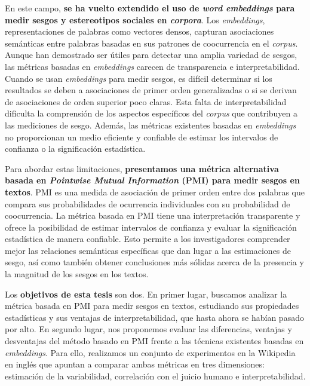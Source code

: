 En este campo, \textbf{se ha vuelto extendido el uso de \emph{word embeddings} para medir sesgos y estereotipos sociales en \emph{corpora}}. Los \emph{embeddings}, representaciones de palabras como vectores densos, capturan asociaciones semánticas entre palabras basadas en sus patrones de coocurrencia en el \emph{corpus}. Aunque han demostrado ser útiles para detectar una amplia variedad de sesgos, las métricas basadas en \emph{embeddings} carecen de transparencia e interpretabilidad. Cuando se usan \emph{embeddings} para medir sesgos, es difícil determinar si los resultados se deben a asociaciones de primer orden generalizadas o si se derivan de asociaciones de orden superior poco claras. Esta falta de interpretabilidad dificulta la comprensión de los aspectos específicos del \emph{corpus} que contribuyen a las mediciones de sesgo. Además, las métricas existentes basadas en \emph{embeddings} no proporcionan un medio eficiente y confiable de estimar los intervalos de confianza o la significación estadística.


Para abordar estas limitaciones, \textbf{presentamos una métrica alternativa basada en \emph{Pointwise Mutual Information} (PMI) para medir sesgos en textos}. PMI es una medida de asociación de primer orden entre dos palabras que compara sus probabilidades de ocurrencia individuales con su probabilidad de coocurrencia. La métrica basada en PMI tiene una interpretación transparente y ofrece la posibilidad de estimar intervalos de confianza y evaluar la significación estadística de manera confiable. Esto permite a los investigadores comprender mejor las relaciones semánticas específicas que dan lugar a las estimaciones de sesgo, así como también obtener conclusiones más sólidas acerca de la presencia y la magnitud de los sesgos en los textos.

Los \textbf{objetivos de esta tesis} son dos. En primer lugar, buscamos analizar la métrica basada en PMI para medir sesgos en textos, estudiando sus propiedades estadísticas y sus ventajas de interpretabilidad, que hasta ahora se habían pasado por alto. En segundo lugar, nos proponemos evaluar las diferencias, ventajas y desventajas del método basado en PMI frente a las técnicas existentes basadas en \emph{embeddings}. Para ello, realizamos un conjunto de experimentos en la Wikipedia en inglés que apuntan a comparar ambas métricas en tres dimensiones: estimación de la variabilidad, correlación con el juicio humano e interpretabilidad. 


